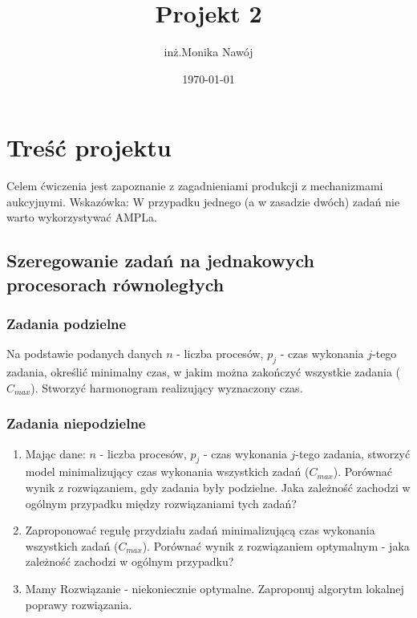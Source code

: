 \documentclass[
    12pt, %
]{../fphw}
\title{Projekt 2} %
\author{inż.Monika Nawój} %
\date{\today} %
\institute{Politechnika Warszawska \\ Wydział Elektroniki i Technik Informacyjnych} %
\begin{document}
\maketitle %


\section{Treść projektu}
Celem ćwiczenia jest zapoznanie z zagadnieniami produkcji
z mechanizmami aukcyjnymi.
Wskazówka: W przypadku jednego (a w zasadzie dwóch) zadań nie warto
wykorzystywać AMPLa.
\subsection {Szeregowanie zadań na jednakowych procesorach równoległych}
\subsubsection{Zadania podzielne}
Na podstawie podanych danych \(n\) - liczba procesów,
\(p_j\) - czas wykonania \(j\)-tego zadania, określić minimalny czas,
w jakim można zakończyć wszystkie zadania (\(C_{max}\)).
Stworzyć harmonogram realizujący wyznaczony czas.
\subsubsection{Zadania niepodzielne}
\begin{enumerate}[label=(\alph*)]
    \item \label{12a} Mając dane: \(n\) - liczba procesów, \(p_j\) - czas wykonania
          \(j\)-tego zadania, stworzyć model minimalizujący czas wykonania
          wszystkich zadań (\(C_{max}\)). Porównać wynik z rozwiązaniem,
          gdy zadania były podzielne.
          Jaka zależność zachodzi w ogólnym przypadku między rozwiązaniami tych zadań?
    \item \label{12b} Zaproponować regułę przydziału zadań minimalizującą czas
          wykonania wszystkich zadań (\(C_{max}\)).
          Porównać wynik z rozwiązaniem optymalnym - jaka zależność zachodzi w ogólnym przypadku?
    \item \label{12c} Mamy Rozwiązanie - niekoniecznie optymalne. Zaproponuj algorytm lokalnej poprawy rozwiązania.
\end{enumerate}
\end{document}
